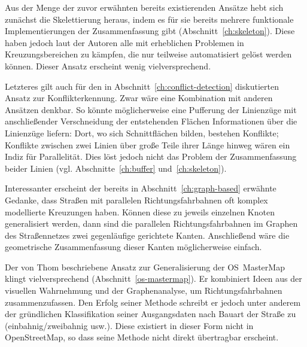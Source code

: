 \documentclass[../main/thesis.tex]{subfiles}
\begin{document}


Aus der Menge der zuvor erwähnten bereits existierenden Ansätze hebt sich zunächst die Skelettierung heraus, indem es für sie bereits mehrere funktionale Implementierungen der Zusammenfassung gibt (Abschnitt~\ref{ch:skeleton}).
Diese haben jedoch laut der Autoren alle mit erheblichen Problemen in Kreuzungsbereichen zu kämpfen, die nur teilweise automatisiert gelöst werden können.
Dieser Ansatz erscheint wenig vielversprechend.

Letzteres gilt auch für den in Abschnitt~\ref{ch:conflict-detection} diskutierten Ansatz zur Konflikterkennung.
Zwar wäre eine Kombination mit anderen Ansätzen denkbar.
So könnte möglicherweise eine Pufferung der Linienzüge mit anschließender Verschneidung der entstehenden Flächen Informationen über die Linienzüge liefern:
Dort, wo sich Schnittflächen bilden, bestehen Konflikte;
Konflikte zwischen zwei Linien über große Teile ihrer Länge hinweg wären ein Indiz für Parallelität.
Dies löst jedoch nicht das Problem der Zusammenfassung beider Linien (vgl. Abschnitte~\ref{ch:buffer} und~\ref{ch:skeleton}).

Interessanter erscheint der bereits in Abschnitt~\ref{ch:graph-based} erwähnte Gedanke, dass Straßen mit parallelen Richtungsfahrbahnen oft komplex modellierte Kreuzungen haben.
Können diese zu jeweils einzelnen Knoten generalisiert werden, dann sind die parallelen Richtungsfahrbahnen im Graphen des Straßennetzes zwei gegenläufige gerichtete Kanten.
Anschließend wäre die geometrische Zusammenfassung dieser Kanten möglicherweise einfach.


Der von Thom beschriebene Ansatz zur Generalisierung der OS~MasterMap klingt vielversprechend (Abschnitt~\ref{os-mastermap}).
Er kombiniert Ideen aus der visuellen Wahrnehmung  und der Graphenanalyse, um Richtungsfahrbahnen zusammenzufassen.
Den Erfolg seiner Methode schreibt er jedoch unter anderem der gründlichen Klassifikation seiner Ausgangsdaten nach Bauart der Straße zu (einbahnig/zweibahnig usw.). 
Diese existiert in dieser Form nicht in OpenStreetMap, so dass seine Methode nicht direkt übertragbar erscheint.
\end{document}
